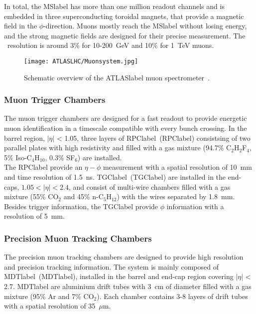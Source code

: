 In total, the \acrshort{MSlabel} has more than one million readout channels and is embedded in three superconducting toroidal magnets, that provide a magnetic field in the $\phi$-direction. Muons mostly reach the \acrshort{MSlabel} without losing energy, and the strong magnetic fields are designed for their precise measurement. The \pT\ resolution is around 3\% for 10-200~GeV and 10\% for 1~TeV muons. 

\begin{figure}[htbp]
    \RawFloats
    \begin{center}
    \texttt{[image: ATLASLHC/Muonsystem.jpg]}
    \caption{
        Schematic overview of the \acrshort{ATLASlabel} muon spectrometer~\cite{Collaboration_2008}. 
    }
    \label{figLHC:ATLASMuon}
    \end{center}
\end{figure}

\subsubsection*{Muon Trigger Chambers}

The muon trigger chambers are designed for a fast readout to provide energetic muon identification in a timescale compatible with every bunch crossing. In the barrel region, $|\eta|$ < 1.05, three layers of \acrlong{RPClabel}~(\acrshort{RPClabel}) consistsing of two parallel plates with high resistivity and filled with a gas mixture (94.7\% C$_2$H$_2$F$_4$, 5\% Iso-C$_4$H$_{10}$, 0.3\% SF$_6$) are installed.\\

The \acrshort{RPClabel} provide an $\eta-\phi$ measurement with a spatial resolution of 10~mm and time resolution of 1.5~ns. \acrlong{TGClabel}~(\acrshort{TGClabel}) are installed in the end-caps, $1.05 < |\eta| < 2.4$, and consist of multi-wire chambers filled with a gas mixture (55\% CO$_2$ and 45\% n-C$_5$H$_{12}$) with the wires separated by 1.8~mm. Besides trigger information, the \acrshort{TGClabel} provide $\phi$ information with a resolution of 5~mm.

\subsubsection*{Precision Muon Tracking Chambers}

The precision muon tracking chambers are designed to provide high resolution and precision tracking information. The system is mainly composed of \acrlong{MDTlabel}~(\acrshort{MDTlabel}), installed in the barrel and end-cap region covering $|\eta|$ < 2.7. \acrshort{MDTlabel} are aluminium drift tubes with 3~cm of diameter filled with a gas mixture (95\% Ar and 7\% \ensuremath{\mathrm{CO_2}}). Each chamber contains 3-8 layers of drift tubes with a spatial resolution of 35~$\mu$m.\\

